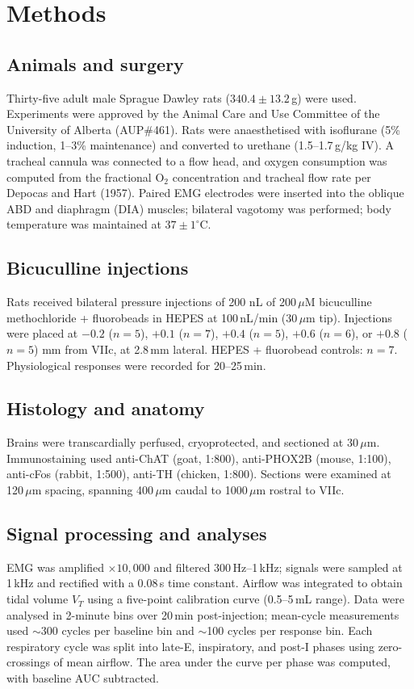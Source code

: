 \documentclass[11pt]{article}
\begin{document}
\section{Methods}
\subsection{Animals and surgery}
Thirty-five adult male Sprague Dawley rats ($340.4 \pm 13.2$\,g) were used. Experiments were approved by the Animal Care and Use Committee of the University of Alberta (AUP\#461). Rats were anaesthetised with isoflurane (5\% induction, 1--3\% maintenance) and converted to urethane (1.5--1.7\,g/kg IV). A tracheal cannula was connected to a flow head, and oxygen consumption was computed from the fractional O$_2$ concentration and tracheal flow rate per Depocas and Hart (1957). Paired EMG electrodes were inserted into the oblique ABD and diaphragm (DIA) muscles; bilateral vagotomy was performed; body temperature was maintained at $37\pm1^\circ$C.

\subsection{Bicuculline injections}
Rats received bilateral pressure injections of 200 nL of 200\,$\mu$M bicuculline methochloride + fluorobeads in HEPES at 100\,nL/min (30\,$\mu$m tip). Injections were placed at $-0.2$ ($n=5$), $+0.1$ ($n=7$), $+0.4$ ($n=5$), $+0.6$ ($n=6$), or $+0.8$ ($n=5$) mm from VIIc, at 2.8\,mm lateral. HEPES + fluorobead controls: $n=7$. Physiological responses were recorded for 20--25\,min.

\subsection{Histology and anatomy}
Brains were transcardially perfused, cryoprotected, and sectioned at 30\,$\mu$m. Immunostaining used anti-ChAT (goat, 1:800), anti-PHOX2B (mouse, 1:100), anti-cFos (rabbit, 1:500), anti-TH (chicken, 1:800). Sections were examined at 120\,$\mu$m spacing, spanning 400\,$\mu$m caudal to 1000\,$\mu$m rostral to VIIc.

\subsection{Signal processing and analyses}
EMG was amplified $\times 10{,}000$ and filtered 300\,Hz--1\,kHz; signals were sampled at 1\,kHz and rectified with a 0.08\,s time constant. Airflow was integrated to obtain tidal volume $V_T$ using a five-point calibration curve (0.5--5\,mL range). Data were analysed in 2-minute bins over 20\,min post-injection; mean-cycle measurements used $\sim$300 cycles per baseline bin and $\sim$100 cycles per response bin. Each respiratory cycle was split into late-E, inspiratory, and post-I phases using zero-crossings of mean airflow. The area under the curve per phase was computed, with baseline AUC subtracted.
\end{document}
